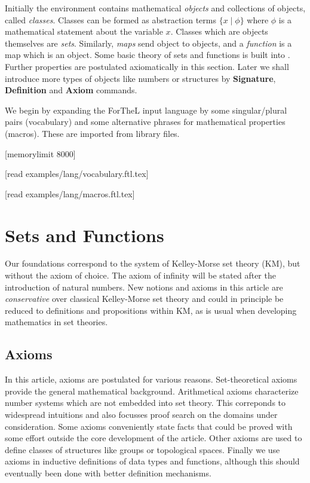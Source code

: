 \documentclass[11pt]{article}
\begin{document}
Initially the environment contains 
mathematical \textit{objects} and collections of objects, called \textit{classes}. Classes can
be formed as abstraction terms $\{x\mid\phi\}$ where $\phi$ is a mathematical
statement about the variable $x$. Classes which are objects themselves are 
\textit{sets}. Similarly, \textit{maps} send object to objects, and a \textit{function}
is a map which is an object.
Some basic theory of sets and functions is built into \Naproche. Further properties
are postulated axiomatically in this section. Later we shall introduce more types 
of objects like numbers or structures 
by \textbf{Signature}, \textbf{Definition} and \textbf{Axiom} commands.

We begin by expanding the ForTheL input language by some
singular/plural pairs (vocabulary) and some alternative phrases 
for mathematical properties (macros). These are imported from
library files.


\begin{forthel}



[memorylimit 8000]


[read examples/lang/vocabulary.ftl.tex]

[read examples/lang/macros.ftl.tex]

\end{forthel}

\section{Sets and Functions}
Our foundations correspond to the system of Kelley-Morse set theory (KM), 
but without the axiom of choice. The axiom of infinity will be stated after
the introduction of natural numbers.
New notions and axioms in
this article are \textit{conservative} over classical Kelley-Morse set theory and 
could in principle be reduced to definitions and propositions within
KM, as is usual when developing mathematics in set theories.

\subsection{Axioms}

In this article, axioms are postulated for various reasons. Set-theoretical
axioms provide the general mathematical background. Arithmetical axioms 
characterize 
number systems which are not embedded into set theory. This correponds to
widespread intuitions and also focusses proof search on the domains under
consideration. Some axioms conveniently state facts that could be 
proved with some effort outside the core development of the article. 
Other axioms are used to define classes of structures like groups or 
topological spaces. Finally we use axioms in inductive definitions
of data types and functions, although this should eventually been done
with better definition mechanisms. 
\end{document}
